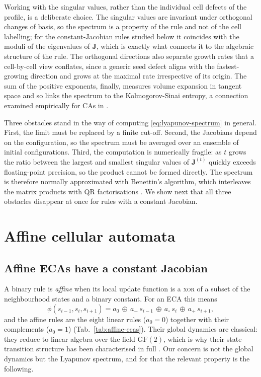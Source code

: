 \documentclass[a4paper,fleqn]{cas-dc}
\begin{document}
Working with the singular values, rather than the individual cell defects of the profile, is a deliberate choice. The singular values are invariant under orthogonal changes of basis, so the spectrum is a property of the rule and not of the cell labelling; for the constant-Jacobian rules studied below it coincides with the moduli of the eigenvalues of $\mathbf{J}$, which is exactly what connects it to the algebraic structure of the rule. The orthogonal directions also separate growth rates that a cell-by-cell view conflates, since a generic seed defect aligns with the fastest-growing direction and grows at the maximal rate irrespective of its origin. The sum of the positive exponents, finally, measures volume expansion in tangent space and so links the spectrum to the Kolmogorov-Sinai entropy, a connection examined empirically for CAs in \cite{vispoel2024damage}.

Three obstacles stand in the way of computing \eqref{eq:lyapunov-spectrum} in general. First, the limit must be replaced by a finite cut-off. Second, the Jacobians depend on the configuration, so the spectrum must be averaged over an ensemble of initial configurations. Third, the computation is numerically fragile: as $t$ grows the ratio between the largest and smallest singular values of $\mathbf{J}^{(t)}$ quickly exceeds floating-point precision, so the product cannot be formed directly. The spectrum is therefore normally approximated with Benettin's algorithm, which interleaves the matrix products with QR factorisations \cite{benettin1980lyapunov1,benettin1980lyapunov2}. We show next that all three obstacles disappear at once for rules with a constant Jacobian.

\section{Affine cellular automata}
\label{sec:lattice}

\subsection{Affine ECAs have a constant Jacobian}
\label{sec:affine}

A binary rule is \emph{affine} when its local update function is a \textsc{xor} of a subset of the neighbourhood states and a binary constant. For an ECA this means
\begin{equation}
    \label{eq:affine-eca}
    \phi(s_{i-1},s_i,s_{i+1})
    =a_0\,\oplus\,a_-\,s_{i-1}\,\oplus\,a_\circ\,s_i\,\oplus\,a_+\,s_{i+1},
\end{equation}
and the affine rules are the eight linear rules ($a_0=0$) together with their complements ($a_0 = 1$) (Tab.~\ref{tab:affine-ecas}). Their global dynamics are classical: they reduce to linear algebra over the field $\mathrm{GF}(2)$, which is why their state-transition structure has been characterised in full \cite{martin1984algebraic,manzini1999attractors,hudcova2024simulation}. Our concern is not the global dynamics but the Lyapunov spectrum, and for that the relevant property is the following.
\end{document}
